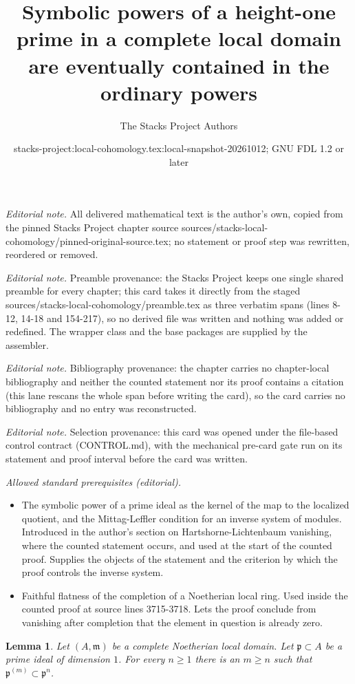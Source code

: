 \documentclass[10pt,a4paper]{amsart}
\title{Symbolic powers of a height-one prime in a complete local domain are eventually contained in the ordinary powers}
\author{The Stacks Project Authors}
\date{stacks-project:local-cohomology.tex:local-snapshot-20261012; GNU FDL 1.2 or later}
\theoremstyle{plain}
\newtheorem{lemma}[subsection]{Lemma}
\theoremstyle{definition}
\theoremstyle{remark}
\numberwithin{equation}{subsection}
\begin{document}
\maketitle
\noindent\textit{Editorial note.} All delivered mathematical text is the author's own, copied from the pinned Stacks Project chapter source sources/stacks-local-cohomology/pinned-original-source.tex; no statement or proof step was rewritten, reordered or removed.\par\medskip
\noindent\textit{Editorial note.} Preamble provenance: the Stacks Project keeps one single shared preamble for every chapter; this card takes it directly from the staged sources/stacks-local-cohomology/preamble.tex as three verbatim spans (lines 8-12, 14-18 and 154-217), so no derived file was written and nothing was added or redefined. The wrapper class and the base packages are supplied by the assembler.\par\medskip
\noindent\textit{Editorial note.} Bibliography provenance: the chapter carries no chapter-local bibliography and neither the counted statement nor its proof contains a citation (this lane rescans the whole span before writing the card), so the card carries no bibliography and no entry was reconstructed.\par\medskip
\noindent\textit{Editorial note.} Selection provenance: this card was opened under the file-based control contract (CONTROL.md), with the mechanical pre-card gate run on its statement and proof interval before the card was written.\par\medskip
\noindent\textit{Allowed standard prerequisites (editorial).}\begin{itemize}
\item The symbolic power of a prime ideal as the kernel of the map to the localized quotient, and the Mittag-Leffler condition for an inverse system of modules. Introduced in the author's section on Hartshorne-Lichtenbaum vanishing, where the counted statement occurs, and used at the start of the counted proof. Supplies the objects of the statement and the criterion by which the proof controls the inverse system.
\item Faithful flatness of the completion of a Noetherian local ring. Used inside the counted proof at source lines 3715-3718. Lets the proof conclude from vanishing after completion that the element in question is already zero.
\end{itemize}\medskip
\begin{lemma}
\label{lemma-inverse-system-symbolic-powers}
Let $(A, \mathfrak m)$ be a complete Noetherian local domain. Let
$\mathfrak p \subset A$ be a prime ideal of dimension $1$.
For every $n \geq 1$ there is an $m \geq n$ such that
$\mathfrak p^{(m)} \subset \mathfrak p^n$.
\end{lemma}
\end{document}

